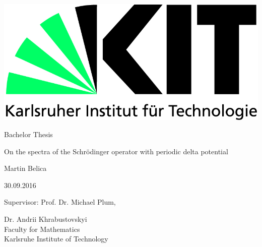 \begin{titlepage}
  \includegraphics[scale=0.45]{kit-logo.jpg}
  \vspace*{2cm} 

  \begin{center} \large 
    
    Bachelor Thesis
    \vspace*{2cm}

    {\huge On the spectra of the Schrödinger operator with periodic delta potential}
    \vspace*{2.5cm}

    Martin Belica
    \vspace*{0.125cm}

    30.09.2016
    \vspace*{4.25cm}


    Supervisor: Prof. Dr. Michael Plum,
    \vspace*{0.125cm}
    
    Dr. Andrii Khrabustovskyi \\[1cm]
    Faculty for Mathematics \\[1cm]
	Karlsruhe Institute of Technology
  \end{center}
\end{titlepage}
